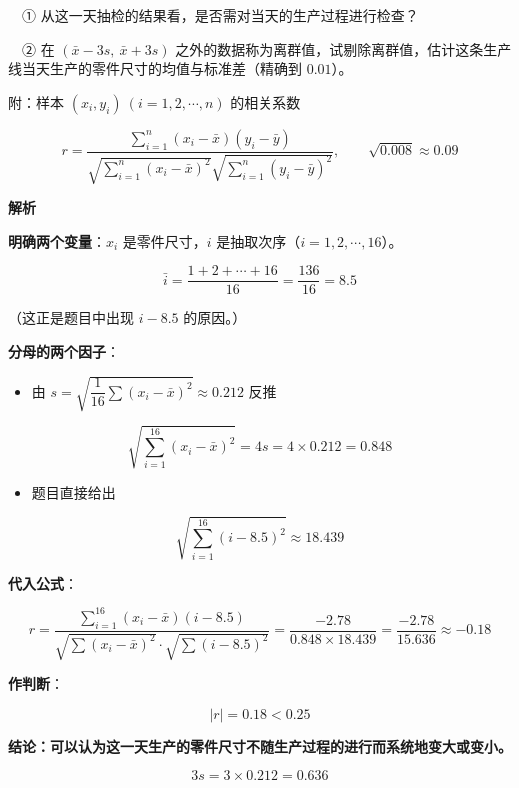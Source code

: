 \begin{answer}
  　① 从这一天抽检的结果看，是否需对当天的生产过程进行检查？

  　② 在 $(\bar x-3s,\ \bar x+3s)$ 之外的数据称为离群值，试剔除离群值，估计这条生产线当天生产的零件尺寸的均值与标准差（精确到 $0.01$）。

  附：样本 $\left(x_i,y_i\right)\ (i=1,2,\cdots,n)$ 的相关系数

\nopagebreak[4]
\[r=\frac{\sum\limits_{i=1}^{n}\left(x_i-\bar x\right)\left(y_i-\bar y\right)}{\sqrt{\sum\limits_{i=1}^{n}\left(x_i-\bar x\right)^{2}}\sqrt{\sum\limits_{i=1}^{n}\left(y_i-\bar y\right)^{2}}},\qquad \sqrt{0.008}\approx0.09\]

\textbf{解析}


\textbf{明确两个变量}：$x_i$ 是零件尺寸，$i$ 是抽取次序（$i=1,2,\cdots,16$）。

\nopagebreak[4]
\[\bar i=\frac{1+2+\cdots+16}{16}=\frac{136}{16}=8.5\]

（这正是题目中出现 $i-8.5$ 的原因。）

\textbf{分母的两个因子}：

\begin{itemize}
\item 由 $s=\sqrt{\dfrac1{16}\sum\left(x_i-\bar x\right)^{2}}\approx0.212$ 反推
\end{itemize}
\nopagebreak[4]
\[\sqrt{\sum_{i=1}^{16}\left(x_i-\bar x\right)^{2}}=4s=4\times0.212=0.848\]
\begin{itemize}
\item 题目直接给出
\end{itemize}
\nopagebreak[4]
\[\sqrt{\sum_{i=1}^{16}(i-8.5)^{2}}\approx18.439\]

\textbf{代入公式}：

\nopagebreak[4]
\[r=\frac{\sum\limits_{i=1}^{16}\left(x_i-\bar x\right)(i-8.5)}{\sqrt{\sum\left(x_i-\bar x\right)^{2}}\cdot\sqrt{\sum(i-8.5)^{2}}}=\frac{-2.78}{0.848\times18.439}=\frac{-2.78}{15.636}\approx-0.18\]

\textbf{作判断}：

\nopagebreak[4]
\[|r|=0.18<0.25\]

\textbf{结论：可以认为这一天生产的零件尺寸不随生产过程的进行而系统地变大或变小。}


\nopagebreak[4]
\[3s=3\times0.212=0.636\]


\end{answer}
